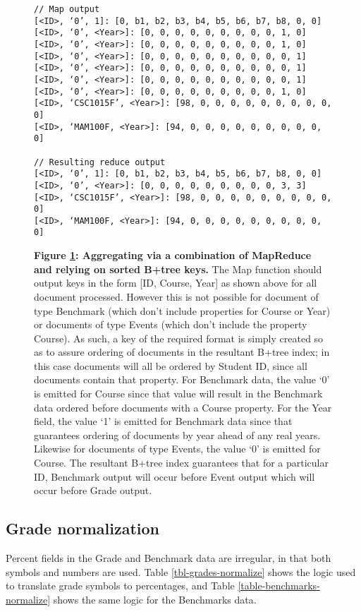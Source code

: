 \begin{figure}[H]
    \centering
    \begin{mdframed}
        \centering
        \begin{verbatim}
// Map output
[<ID>, ‘0’, 1]: [0, b1, b2, b3, b4, b5, b6, b7, b8, 0, 0]
[<ID>, ‘0’, <Year>]: [0, 0, 0, 0, 0, 0, 0, 0, 0, 1, 0]
[<ID>, ‘0’, <Year>]: [0, 0, 0, 0, 0, 0, 0, 0, 0, 1, 0]
[<ID>, ‘0’, <Year>]: [0, 0, 0, 0, 0, 0, 0, 0, 0, 0, 1]
[<ID>, ‘0’, <Year>]: [0, 0, 0, 0, 0, 0, 0, 0, 0, 0, 1]
[<ID>, ‘0’, <Year>]: [0, 0, 0, 0, 0, 0, 0, 0, 0, 0, 1]
[<ID>, ‘0’, <Year>]: [0, 0, 0, 0, 0, 0, 0, 0, 0, 1, 0]
[<ID>, ‘CSC1015F’, <Year>]: [98, 0, 0, 0, 0, 0, 0, 0, 0, 0, 0]
[<ID>, ‘MAM100F, <Year>]: [94, 0, 0, 0, 0, 0, 0, 0, 0, 0, 0]

// Resulting reduce output
[<ID>, ‘0’, 1]: [0, b1, b2, b3, b4, b5, b6, b7, b8, 0, 0]
[<ID>, ‘0’, <Year>]: [0, 0, 0, 0, 0, 0, 0, 0, 0, 3, 3]
[<ID>, ‘CSC1015F’, <Year>]: [98, 0, 0, 0, 0, 0, 0, 0, 0, 0, 0]
[<ID>, ‘MAM100F, <Year>]: [94, 0, 0, 0, 0, 0, 0, 0, 0, 0, 0]
        \end{verbatim}
    \end{mdframed}
    \caption[Aggregation By Sorted MapReduce output]{\textbf{Figure \ref{mapreduce-key-output}: Aggregating via a combination of MapReduce and relying on sorted B+tree keys.} The Map function should output keys in the form [ID, Course, Year] as shown above for all document processed. However this is not possible for document of type Benchmark (which don't include properties for Course or Year) or documents of type Events (which don't include the property Course). As such, a key of the required format is simply created so as to assure ordering of documents in the resultant B+tree index; in this case documents will all be ordered by Student ID, since all documents contain that property. For Benchmark data, the value `0' is emitted for Course since that value will result in the Benchmark data ordered before documents with a Course property. For the Year field, the value `1' is emitted for Benchmark data since that guarantees ordering of documents by year ahead of any real years. Likewise for documents of type Events, the value `0' is emitted for Course. The resultant B+tree index guarantees that for a particular ID, Benchmark output will occur before Event output which will occur before Grade output.}
    \label{mapreduce-key-output}
\end{figure}

\subsection{Grade normalization}
Percent fields in the Grade and Benchmark data are irregular, in that both symbols and numbers are used. Table \ref{tbl-grades-normalize} shows the logic used to translate grade symbols to percentages, and Table \ref{table-benchmarks-normalize} shows the same logic for the Benchmarks data.


